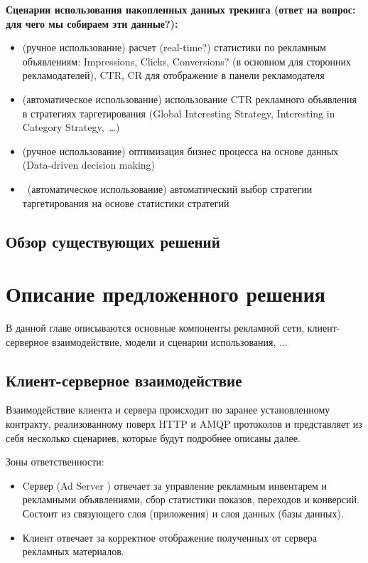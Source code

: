 \documentclass[times]{itmo-student-thesis}
\begin{document}
\textbf{Сценарии использования накопленных данных трекинга (ответ на вопрос: для чего мы собираем эти данные?):}
\begin{itemize}
	\item (ручное использование) расчет (real-time?) статистики по рекламным объявлениям: Impressions, Clicks, Conversions? (в основном для сторонних рекламодателей), CTR, CR для отображение в панели рекламодателя
	\item (автоматическое использование) использование CTR рекламного объявления в стратегиях таргетирования (Global Interesting Strategy, Interesting in Category Strategy, …)
	\item (ручное использование) оптимизация бизнес процесса на основе данных (Data-driven decision making)
	\item  (автоматическое использование) автоматический выбор стратегии таргетирования на основе статистики стратегий
\end{itemize}


\section{Обзор существующих решений}

\finishrelatedwork %


\chapterconclusion







\chapter{Описание предложенного решения}

В данной главе описываются основные компоненты рекламной сети, клиент-серверное взаимодействие, модели и сценарии использования, ...

\section{Клиент-серверное взаимодействие}

Взаимодействие клиента и сервера происходит по заранее установленному контракту, реализованному поверх HTTP и AMQP протоколов и представляет из себя несколько сценариев, которые будут подробнее описаны далее.

Зоны ответственности:
\begin{itemize}
	\item Cервер (Ad Server \cite{ad-server}) отвечает за управление рекламным инвентарем и рекламными объявлениями, сбор статистики показов, переходов и конверсий. Состоит из связующего слоя (приложения) и слоя данных (базы данных).
	\item Клиент отвечает за корректное отображение полученных от сервера рекламных материалов.
\end{itemize}
\end{document}
